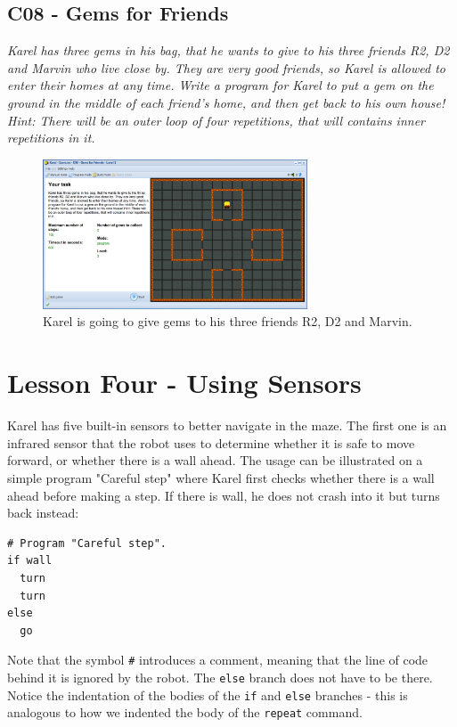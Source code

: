 \documentclass[article,A4,12pt]{llncs}
\begin{document}
\subsection{C08 - Gems for Friends}

{\em Karel has three gems in his bag, that he wants to give to his three friends R2, D2 and Marvin who live close by. They are very good friends, so Karel is allowed to enter their homes at any time. Write a program for Karel to put a gem on the ground in the middle of each friend's home, and then get back to his own house! Hint: There will be an outer loop of four repetitions, that will contains inner repetitions in it. }

\newpage

\begin{figure}[!ht]
\begin{center}
\includegraphics[width=0.7\textwidth]{img/c08.png}
\end{center}
\vspace{-4mm}
\caption{Karel is going to give gems to his three friends R2, D2 and Marvin.}
\label{fig:c08}
\vspace{-4mm}
\end{figure}
\noindent



\section{Lesson Four - Using Sensors}

Karel has five built-in sensors to better navigate in the maze. 
The first one is an infrared sensor that the robot uses to determine 
whether it is safe to move forward, or whether there is a wall ahead.
The usage can be illustrated on a simple program "Careful step" 
where Karel first checks whether there is a wall ahead before
making a step. If there is wall, he does not crash into it but turns 
back instead: 

\begin{verbatim}
# Program "Careful step".
if wall
  turn
  turn
else
  go
\end{verbatim}
Note that the symbol {\tt \#} introduces a comment, meaning that the line 
of code behind it is ignored by the robot.
The {\tt else} branch does not have to be there. Notice the indentation 
of the bodies of the {\tt if} and {\tt else} branches - this is analogous 
to how we indented the body of the {\tt repeat} command.
\end{document}
